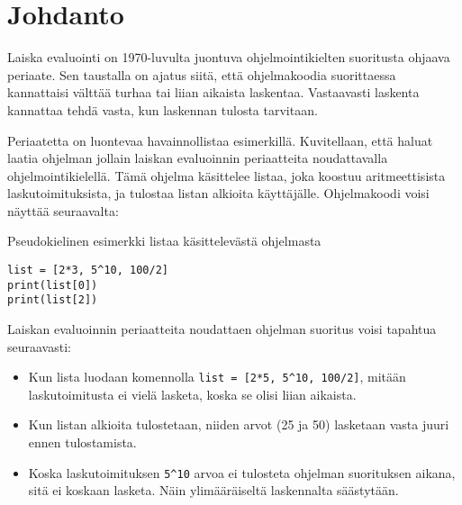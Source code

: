 
\section{Johdanto}

Laiska evaluointi on 1970-luvulta juontuva ohjelmointikielten suoritusta ohjaava periaate. Sen taustalla on ajatus siitä, että ohjelmakoodia suorittaessa kannattaisi välttää turhaa tai liian aikaista laskentaa. Vastaavasti laskenta kannattaa tehdä vasta, kun laskennan tulosta tarvitaan.

Periaatetta on luontevaa havainnollistaa esimerkillä. Kuvitellaan, että haluat laatia ohjelman jollain laiskan evaluoinnin periaatteita noudattavalla ohjelmointikielellä. Tämä ohjelma käsittelee listaa, joka koostuu aritmeettisista laskutoimituksista, ja tulostaa listan alkioita käyttäjälle. Ohjelmakoodi voisi näyttää seuraavalta:


\begin{listing}[H]
  \caption{Pseudokielinen esimerkki listaa käsittelevästä ohjelmasta}
  \bigskip
  \begin{verbatim}
list = [2*3, 5^10, 100/2]
print(list[0])
print(list[2])
  \end{verbatim}
\end{listing}

Laiskan evaluoinnin periaatteita noudattaen ohjelman suoritus voisi tapahtua seuraavasti:

\begin{itemize}
    \item{Kun lista luodaan komennolla \verb!list = [2*5, 5^10, 100/2]!, mitään laskutoimitusta ei vielä lasketa, koska se olisi liian aikaista.}
    \item{Kun listan alkioita tulostetaan, niiden arvot (25 ja 50) lasketaan vasta juuri ennen tulostamista.}
    \item{Koska laskutoimituksen \verb!5^10! arvoa ei tulosteta ohjelman suorituksen aikana, sitä ei koskaan lasketa. Näin ylimääräiseltä laskennalta säästytään.}
\end{itemize}

